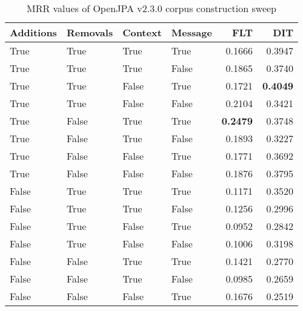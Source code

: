 
\begin{table}
\begin{spacing}{1.2}
\centering
\caption{MRR values of OpenJPA v2.3.0 corpus construction sweep}
\label{table:openjpa_corpus_sweep}
\vspace{0.2em}
\begin{tabular}{llll|rr}
\toprule
Additions & Removals & Context & Message & FLT &       DIT \\
\midrule
     True &     True &    True &    True &           0.1666 &       0.3947 \\
     True &     True &    True &   False &           0.1865 &       0.3740 \\
     True &     True &   False &    True &           0.1721 & {\bf 0.4049} \\
     True &     True &   False &   False &           0.2104 &       0.3421 \\
     True &    False &    True &    True &     {\bf 0.2479} &       0.3748 \\
     True &    False &    True &   False &           0.1893 &       0.3227 \\
     True &    False &   False &    True &           0.1771 &       0.3692 \\
     True &    False &   False &   False &           0.1876 &       0.3795 \\
    False &     True &    True &    True &           0.1171 &       0.3520 \\
    False &     True &    True &   False &           0.1256 &       0.2996 \\
    False &     True &   False &    True &           0.0952 &       0.2842 \\
    False &     True &   False &   False &           0.1006 &       0.3198 \\
    False &    False &    True &    True &           0.1421 &       0.2770 \\
    False &    False &    True &   False &           0.0985 &       0.2659 \\
    False &    False &   False &    True &           0.1676 &       0.2519 \\
\bottomrule
\end{tabular}

\end{spacing}
\end{table}

